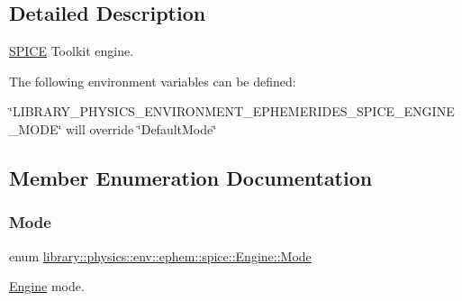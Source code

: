 \subsection{Detailed Description}
\hyperlink{classlibrary_1_1physics_1_1env_1_1ephem_1_1_s_p_i_c_e}{S\+P\+I\+CE} Toolkit engine. 

The following environment variables can be defined\+:


\begin{DoxyItemize}
\item \char`\"{}\+L\+I\+B\+R\+A\+R\+Y\+\_\+\+P\+H\+Y\+S\+I\+C\+S\+\_\+\+E\+N\+V\+I\+R\+O\+N\+M\+E\+N\+T\+\_\+\+E\+P\+H\+E\+M\+E\+R\+I\+D\+E\+S\+\_\+\+S\+P\+I\+C\+E\+\_\+\+E\+N\+G\+I\+N\+E\+\_\+\+M\+O\+D\+E\char`\"{} will override \char`\"{}\+Default\+Mode\char`\"{} 
\end{DoxyItemize}

\subsection{Member Enumeration Documentation}
\mbox{\label{classlibrary_1_1physics_1_1env_1_1ephem_1_1spice_1_1_engine_a2d185a63bce354bff9ad38810410eab4}} 
\subsubsection{\texorpdfstring{Mode}{Mode}}
{\footnotesize\ttfamily enum \hyperlink{classlibrary_1_1physics_1_1env_1_1ephem_1_1spice_1_1_engine_a2d185a63bce354bff9ad38810410eab4}{library\+::physics\+::env\+::ephem\+::spice\+::\+Engine\+::\+Mode}\hspace{0.3cm}{\ttfamily [strong]}}



\hyperlink{classlibrary_1_1physics_1_1env_1_1ephem_1_1spice_1_1_engine}{Engine} mode. 

